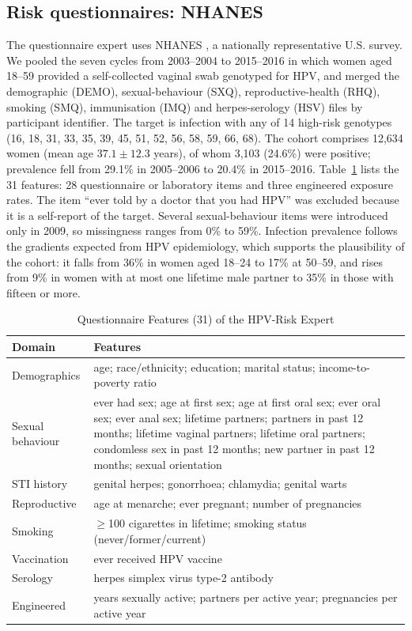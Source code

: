 \documentclass[lettersize,journal]{IEEEtran}
\begin{document}
\subsection{Risk questionnaires: NHANES}
The questionnaire expert uses NHANES \cite{nhanes}, a nationally representative U.S. survey. We pooled the seven cycles from 2003--2004 to 2015--2016 in which women aged 18--59 provided a self-collected vaginal swab genotyped for HPV, and merged the demographic (DEMO), sexual-behaviour (SXQ), reproductive-health (RHQ), smoking (SMQ), immunisation (IMQ) and herpes-serology (HSV) files by participant identifier. The target is infection with any of 14 high-risk genotypes (16, 18, 31, 33, 35, 39, 45, 51, 52, 56, 58, 59, 66, 68). The cohort comprises 12,634 women (mean age $37.1\pm12.3$ years), of whom 3,103 (24.6\%) were positive; prevalence fell from 29.1\% in 2005--2006 to 20.4\% in 2015--2016. Table~\ref{tab:features} lists the 31 features: 28 questionnaire or laboratory items and three engineered exposure rates. The item ``ever told by a doctor that you had HPV'' was excluded because it is a self-report of the target. Several sexual-behaviour items were introduced only in 2009, so missingness ranges from 0\% to 59\%. Infection prevalence follows the gradients expected from HPV epidemiology, which supports the plausibility of the cohort: it falls from 36\% in women aged 18--24 to 17\% at 50--59, and rises from 9\% in women with at most one lifetime male partner to 35\% in those with fifteen or more.

\begin{table}[t]
\caption{Questionnaire Features (31) of the HPV-Risk Expert}
\label{tab:features}
\centering\footnotesize
\setlength{\tabcolsep}{3pt}
\begin{tabular}{@{}p{}p{}@{}}
\toprule
Domain & Features \\
\midrule
Demographics & age; race/ethnicity; education; marital status; income-to-poverty ratio \\
Sexual behaviour & ever had sex; age at first sex; age at first oral sex; ever oral sex; ever anal sex; lifetime partners; partners in past 12 months; lifetime vaginal partners; lifetime oral partners; condomless sex in past 12 months; new partner in past 12 months; sexual orientation \\
STI history & genital herpes; gonorrhoea; chlamydia; genital warts \\
Reproductive & age at menarche; ever pregnant; number of pregnancies \\
Smoking & $\geq$100 cigarettes in lifetime; smoking status (never/former/current) \\
Vaccination & ever received HPV vaccine \\
Serology & herpes simplex virus type-2 antibody \\
Engineered & years sexually active; partners per active year; pregnancies per active year \\
\bottomrule
\end{tabular}
\end{table}
\end{document}
